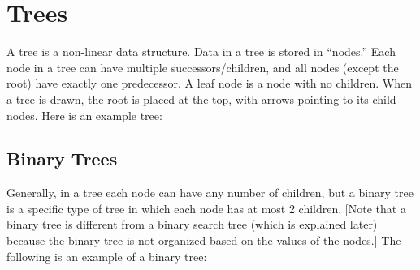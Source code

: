 \section{Trees}
A tree is a non-linear data structure. Data in a tree is stored in “nodes.” Each node in a tree can have multiple successors/children, and all nodes (except the root) have exactly one predecessor. A leaf node is a node with no children. When a tree is drawn, the root is placed at the top, with arrows pointing to its child nodes. Here is an example tree: 

\begin{center}
\end{center}

\subsection{Binary Trees}
Generally, in a tree each node can have any number of children, but a binary tree is a specific type of tree in which each node has at most 2 children. [Note that a binary tree is different from a binary search tree (which is explained later) because the binary tree is not organized based on the values of the nodes.] The following is an example of a binary tree: 

\begin{center}
\end{center}

